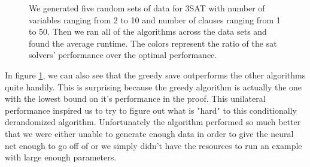 \documentclass[paper=a4, fontsize=11pt]{scrartcl} %
\numberwithin{equation}{section} %
\numberwithin{figure}{section} %
\numberwithin{table}{section} %
\begin{document}
\begin{figure}[ht]
\centerline{
}
\vspace{-0.1in}
\caption{We generated five random sets of data for 3SAT with number of variables ranging from 2 to 10 and number of clauses ranging from 1 to 50.  Then we ran all of the algorithms across the data sets and found the average runtime.  The colors represent the ratio of the sat solvers' performance over the optimal performance.}
\label{rt_heatmap}
\end{figure}

In figure \ref{rt_heatmap}, we can also see that the greedy save outperforms the other algorithms quite handily.  This is surprising because the greedy algorithm is actually the one with the lowest bound on it's performance in the proof.  This unilateral performance inspired us to try to figure out what is "hard" to this conditionally derandomized algorithm.  Unfortunately the algorithm performed so much better that we were either unable to generate enough data in order to give the neural net enough to go off of or we simply didn't have the resources to run an example with large enough parameters.\\
\end{document}
